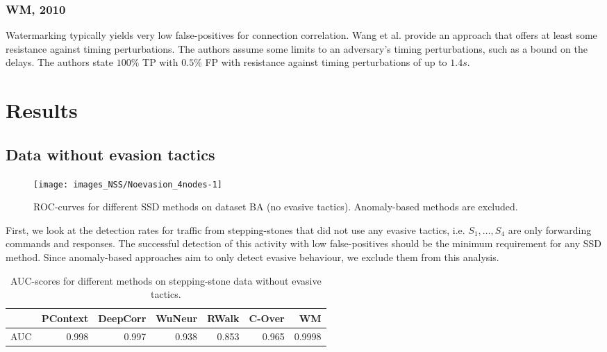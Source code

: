 \subsubsection{WM, 2010}
Watermarking typically yields very low false-positives for connection correlation. %
Wang et al. \cite{wang2010robust} provide an approach that offers at least some resistance against timing perturbations. The authors assume some limits to an adversary's timing perturbations, such as a bound on the delays.%
The authors state $100\%$ TP with $0.5\%$ FP with resistance against timing perturbations of up to $1.4s$.

\section{Results}\label{SecN:Results}


\subsection{Data without evasion tactics}

\begin{figure}
\texttt{[image: images\_NSS/Noevasion\_4nodes-1]} \caption[ROC-curves for different SSD methods on dataset BA (no evasive tactics)]{ROC-curves for different SSD methods on dataset BA (no evasive tactics). Anomaly-based methods are excluded.}\label{figN:Noevasion_4nodes}
\end{figure}



First, we look at the detection rates for traffic from stepping-stones that did not use any evasive tactics, i.e. $S_1,\dots,S_4$ are only forwarding commands and responses. The successful detection of this activity with low false-positives should be the minimum requirement for any SSD method. Since anomaly-based approaches aim to only detect evasive behaviour, we exclude them from this analysis. 

\begin{table}
\centering
\begin{tabular}{l|r|r|r|r|r|r}
  \hline
 & PContext & DeepCorr & WuNeur & RWalk & C-Over & WM \\ 
  \hline
AUC & 0.998 & 0.997 & 0.938 & 0.853 & 0.965 & 0.9998 \\ 
   \hline
\end{tabular}

\caption{AUC-scores for different methods on stepping-stone data without evasive tactics.}\label{tabN:dfAUC}

\vspace{-0.6cm}
\end{table}

